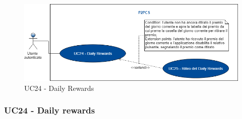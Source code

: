 \begin{figure}[h]
	\includegraphics[width=13.2cm]{res/images/UC24Daily.png}
	\centering
	\caption{UC24 - Daily Rewards}
\end{figure}
\subsubsection{UC24 - Daily rewards}
